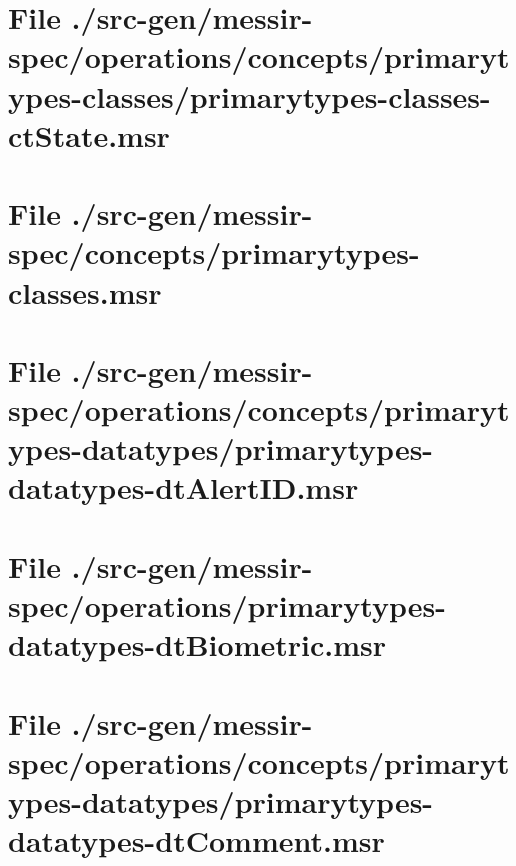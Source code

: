 \section[File /src-gen/messir-spec/operations.../primarytypes-classes-ctState.msr]{File ./src-gen/messir-spec/operations/concepts/primarytypes-classes/primarytypes-classes-ctState.msr}
\scriptsize

\normalsize
	
\section[File /src-gen/messir-spec/concepts/primarytypes-classes.msr]{File ./src-gen/messir-spec/concepts/primarytypes-classes.msr}
\scriptsize

\normalsize
	
\section[File /src-gen/messir-spec/operations.../primarytypes-datatypes-dtAlertID.msr]{File ./src-gen/messir-spec/operations/concepts/primarytypes-datatypes/primarytypes-datatypes-dtAlertID.msr}
\scriptsize

\normalsize
	
\section[File /src-gen/messir-spec/operations/primarytypes-datatypes-dtBiometric.msr]{File ./src-gen/messir-spec/operations/primarytypes-datatypes-dtBiometric.msr}
\scriptsize

\normalsize
	
\section[File /src-gen/messir-spec/operations.../primarytypes-datatypes-dtComment.msr]{File ./src-gen/messir-spec/operations/concepts/primarytypes-datatypes/primarytypes-datatypes-dtComment.msr}
\scriptsize

\normalsize
	
